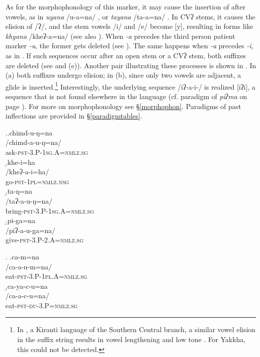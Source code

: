 As for the morphophonology of this marker, it may cause the insertion of  after vowels, as in \emph{uyana} /u-a=na/ , or \emph{tayana} /ta-a=na/ . In CVʔ stems, it causes the elision of /ʔ/, and the stem vowels /i/ and /e/ become [y], resulting in forms like   \emph{khyana} /kheʔ-a=na/  (see also \Last[a]).  When \emph{-a} precedes the third person patient marker \emph{-u}, the former gets deleted (see \Next[a]). The same happens when \emph{-a} precedes \emph{-i}, as in \Next[b]. If such sequences occur after an open stem or a CVʔ stem, both suffixes are deleted (see \Next[c] and (e)). Another pair illustrating these processes is shown in \NNext. In (a) both suffixes undergo elision; in (b), since only two vowels are adjacent, a glide is inserted.\footnote{In , a Kiranti language of the Southern Central branch, a similar vowel elision in the suffix string results in vowel lengthening and low tone \citep{Bickeletal2006The-Chintang}. For Yakkha, this could not be detected.} Interestingly, the underlying sequence /iʔ-a-i-/ is realized [iʔi], a sequence that is not found elsewhere in the language (cf. paradigm of \emph{piʔma}  on page \pageref{par-pipma-pst}). For more on morphophonology see §\ref{morphophon}. Paradigms of past inflections are provided in §\ref{paradigmtables}.

\ex.\a.\glll chimd-u-ŋ=na\\
 /chimd-a-u-ŋ=na/\\
ask{\scshape -pst-3.P-1sg.A=nmlz.sg}\\
\b.\glll khe-i=ha\\
 /kheʔ-a-i=ha/\\
go{\scshape -pst-1pl=nmlz.nsg}\\
\b.\glll ta-ŋ=na \\
/taʔ-a-u-ŋ=na/\\
bring{\scshape -pst-3.P-1sg.A=nmlz.sg}\\
\b.\glll pi-ga=na \\
/piʔ-a-u-ga=na/\\
give{\scshape -pst-3.P-2.A=nmlz.sg}\\

\ex. \a.\glll ca-m=na\\
 /ca-a-u-m=na/\\
eat{\scshape -pst-3.P-1pl.A=nmlz.sg}\\
\b.\glll ca-ya-c-u=na \\
/ca-a-c-u=na/\\
eat{\scshape -pst-du-3.P=nmlz.sg}\\


